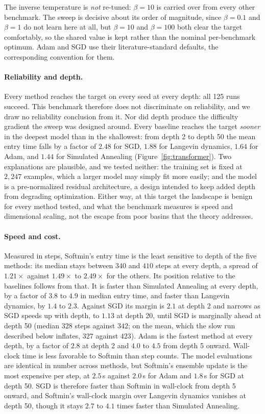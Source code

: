 \documentclass{article}
\theoremstyle{plain}
\theoremstyle{definition}
\theoremstyle{remark}
\begin{document}
The inverse temperature is \emph{not} re-tuned: $\beta=10$ is carried over from every other
benchmark. The sweep is decisive about its order of magnitude, since $\beta=0.1$ and $\beta=1$ do
not learn here at all, but $\beta=10$ and $\beta=100$ both clear the target comfortably, so the
shared value is kept rather than the nominal per-benchmark optimum. Adam and SGD use their
literature-standard defaults, the corresponding convention for them.

\paragraph{Reliability and depth.} Every method reaches the target on every seed at every depth: all 125 runs succeed.
This benchmark therefore does not discriminate on
reliability, and we draw no reliability conclusion from it. Nor did depth produce the difficulty
gradient the sweep was designed around. Every baseline reaches the target \emph{sooner} in the
deepest model than in the shallowest: from depth 2 to depth 50 the mean entry time falls by a
factor of $2.48$ for SGD, $1.88$ for Langevin dynamics, $1.64$ for Adam, and $1.44$ for Simulated
Annealing (Figure~\ref{fig:transformer}). Two explanations are plausible, and we tested
neither: the training set is fixed at $2{,}247$ examples, which a larger model may simply fit more
easily; and the model is a pre-normalized residual architecture, a design intended to keep added
depth from degrading optimization. Either way, at this target the landscape is benign for every
method tested, and what the benchmark measures is speed and dimensional scaling, not the escape
from poor basins that the theory addresses.

\paragraph{Speed and cost.} Measured in steps, Softmin's entry time is the least sensitive to depth of the five methods: its
median stays between $340$ and $410$ steps at every depth, a spread of $1.21\times$ against
$1.49\times$ to $2.49\times$ for the others. Its position relative to the baselines follows from
that. It is faster than Simulated Annealing at every depth, by a factor of $3.8$ to $4.9$ in
median entry time, and faster than Langevin dynamics, by $1.4$ to $2.3$. Against SGD its margin
is $2.1$ at depth 2 and narrows as SGD speeds up with depth, to $1.13$ at depth 20, until SGD is
marginally ahead at depth 50 (median $328$ steps against $342$; on the mean, which the slow run
described below inflates, $327$ against $423$). Adam is the fastest method at every depth, by a
factor of $2.8$ at depth 2 and $4.0$ to $4.5$ from depth 5 onward. Wall-clock time is less
favorable to Softmin than step counts. The model evaluations are identical in number across
methods, but Softmin's ensemble update is the most expensive per step, at $2.5$\,s against
$2.0$\,s for Adam and $1.8$\,s for SGD at depth 50. SGD is therefore faster than Softmin in
wall-clock from depth 5 onward, and Softmin's wall-clock margin over Langevin dynamics vanishes at
depth 50, though it stays $2.7$ to $4.1$ times faster than Simulated Annealing.
\end{document}
